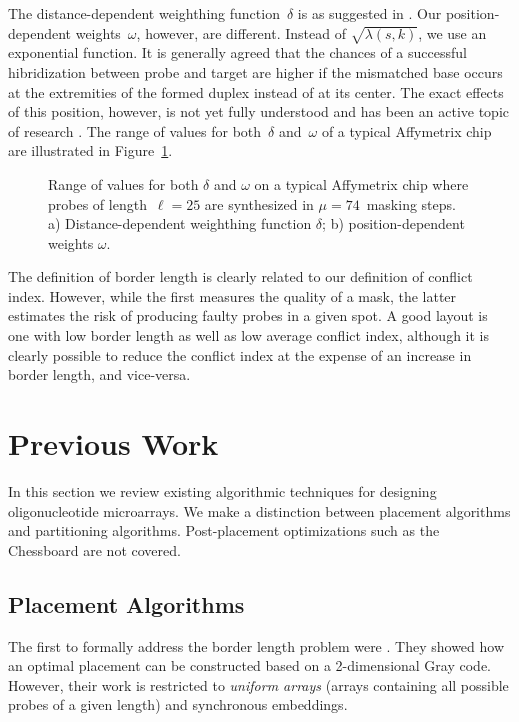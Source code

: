 \documentclass{bioinfo}
\begin{document}
The distance-dependent weighthing function~$\delta$ is as suggested in \citealp{KAHNG03_1}. Our position-dependent weights~$\omega$, however, are different. Instead of $\sqrt{\lambda(s,k)}$, we use an exponential function. It is generally agreed that the chances of a successful hibridization between probe and target are higher if the mismatched base occurs at the extremities of the formed duplex instead of at its center. The exact effects of this position, however, is not yet fully understood and has been an active topic of research \citep{BINDER05}. The range of values for both~$\delta$ and~$\omega$ of a typical Affymetrix chip are illustrated in Figure~\ref{fig:conflit_index_values}.

\begin{figure}
\caption{Range of values for both $\delta$ and $\omega$ on a typical Affymetrix chip where probes of length~$\ell = 25$ are synthesized in $\mu = 74$~masking steps. a) Distance-dependent weighthing function $\delta$; b) position-dependent weights $\omega$.}
\label{fig:conflit_index_values}
\end{figure}

The definition of border length is clearly related to our definition of conflict index. However, while the first measures the quality of a mask, the latter estimates the risk of producing faulty probes in a given spot. A good layout is one with low border length as well as low average conflict index, although it is clearly possible to reduce the conflict index at the expense of an increase in border length, and vice-versa.

\section{Previous Work}
\label{sec:previous_work}

In this section we review existing algorithmic techniques for designing oligonucleotide microarrays. We make a distinction between placement algorithms and partitioning algorithms. Post-placement optimizations such as the Chessboard \citep{KAHNG02} are not covered.

\subsection{Placement Algorithms}
\label{sec:placement_alg}

The first to formally address the border length problem were \citealp{FELDMAN93}. They showed how an optimal placement can be constructed based on a 2-dimensional Gray code. However, their work is restricted to \emph{uniform arrays} (arrays containing all possible probes of a given length) and synchronous embeddings.
\end{document}

